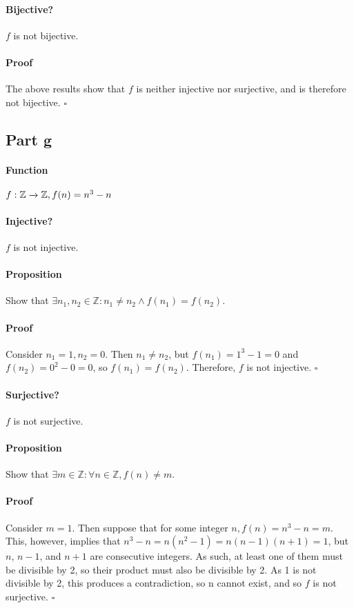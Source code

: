 \documentclass{article}
\begin{document}
{{	\paragraph{Bijective?}
	$f$ is not bijective.
	\vspace{-10pt}
	\paragraph{Proof}
	The above results show that $f$ is neither injective nor surjective, and is therefore not bijective. $\square$
}
}
\subsection{Part g}
{
\paragraph{Function}$f:\mathbb{Z}\xrightarrow{}\mathbb{Z}, f(n)=n^3-n$
{
\paragraph{Injective?}
$f$ is not injective.
\vspace{-10pt}
\paragraph{Proposition}
Show that $\exists n_1, n_2 \in \mathbb{Z}: n_1 \neq n_2 \land f(n_1) = f(n_2)$.
\vspace{-10pt}
\paragraph{Proof}
Consider $n_1 = 1, n_2 = 0$. Then $n_1 \neq n_2$, but $f(n_1) = 1^3-1 = 0$ and $f(n_2) = 0^2-0 = 0$, so $f(n_1) = f(n_2)$. Therefore, $f$ is not injective. $\square$
}
{
\paragraph{Surjective?}
$f$ is not surjective.
\vspace{-10pt}
\paragraph{Proposition}
Show that $\exists m \in \mathbb{Z}: \forall n \in \mathbb{Z}, f(n) \neq m$.
\vspace{-10pt}
\paragraph{Proof}
Consider $m=1$. Then suppose that for some integer $n, f(n) = n^3-n = m$. This, however, implies that $n^3-n = n(n^2-1) = n(n-1)(n+1) = 1$, but $n$, $n-1$, and $n+1$ are consecutive integers. As such, at least one of them must be divisible by 2, so their product must also be divisible by 2. As 1 is not divisible by 2, this produces a contradiction, so n cannot exist, and so $f$ is not surjective. $\square$
}
{
}}
\end{document}
